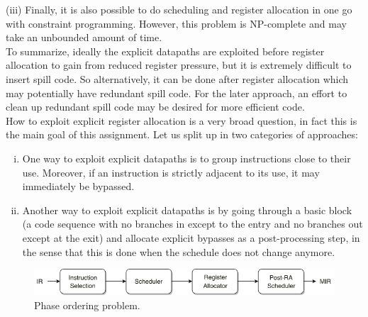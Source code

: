 (iii) Finally, it is also possible to do scheduling and register allocation in one go with constraint programming. However, this problem is NP-complete and may take an unbounded amount of time. \\





To summarize, ideally the explicit datapaths are exploited before register allocation to gain from reduced register pressure, but it is extremely difficult to insert spill code. So alternatively, it can be done after register allocation which may potentially have redundant spill code. For the later approach, an effort to clean up redundant spill code may be desired for more efficient code.\\

How to exploit explicit register allocation is a very broad question, in fact this is the main goal of this assignment. Let us split up in two categories of approaches:
\begin{enumerate}[i.]
  \item One way to exploit explicit datapaths is to group instructions close to their use. Moreover, if an instruction is strictly adjacent to its use, it may immediately be bypassed.%
  \item Another way to exploit explicit datapaths is by going through a basic block (a code sequence with no branches in except to the entry and no branches out except at the exit) and allocate explicit bypasses as a post-processing step, in the sense that this is done when the schedule does not change anymore.
\end{enumerate}

\begin{figure}[t]
\centering
\includegraphics[width=.9\textwidth]{figures/phase_ordering}
\caption{Phase ordering problem.}
\label{fig:phase_ordering}
\end{figure}

